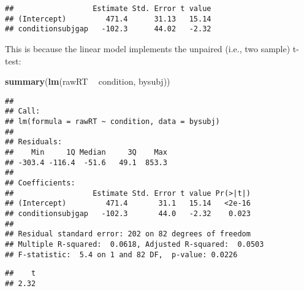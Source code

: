 \documentclass[12pt,]{krantz}
\newenvironment{Shaded}{\begin{snugshade}}{\end{snugshade}}
\newcommand{\DataTypeTok}[1]{\textcolor[rgb]{0.13,0.29,0.53}{#1}}
\newcommand{\DecValTok}[1]{\textcolor[rgb]{0.00,0.00,0.81}{#1}}
\newcommand{\KeywordTok}[1]{\textcolor[rgb]{0.13,0.29,0.53}{\textbf{#1}}}
\newcommand{\NormalTok}[1]{#1}
\newcommand{\OperatorTok}[1]{\textcolor[rgb]{0.81,0.36,0.00}{\textbf{#1}}}
\newcommand{\OtherTok}[1]{\textcolor[rgb]{0.56,0.35,0.01}{#1}}
\newcommand{\StringTok}[1]{\textcolor[rgb]{0.31,0.60,0.02}{#1}}
\begin{document}
\begin{Shaded}
\end{Shaded}

\begin{verbatim}
##                  Estimate Std. Error t value
## (Intercept)         471.4      31.13   15.14
## conditionsubjgap   -102.3      44.02   -2.32
\end{verbatim}

This is because the linear model implements the unpaired (i.e., two sample) t-test:

\begin{Shaded}
\begin{Highlighting}[]
\KeywordTok{summary}\NormalTok{(}\KeywordTok{lm}\NormalTok{(rawRT }\OperatorTok{~}\StringTok{ }\NormalTok{condition, bysubj))}
\end{Highlighting}
\end{Shaded}

\begin{verbatim}
## 
## Call:
## lm(formula = rawRT ~ condition, data = bysubj)
## 
## Residuals:
##    Min     1Q Median     3Q    Max 
## -303.4 -116.4  -51.6   49.1  853.3 
## 
## Coefficients:
##                  Estimate Std. Error t value Pr(>|t|)
## (Intercept)         471.4       31.1   15.14   <2e-16
## conditionsubjgap   -102.3       44.0   -2.32    0.023
## 
## Residual standard error: 202 on 82 degrees of freedom
## Multiple R-squared:  0.0618,	Adjusted R-squared:  0.0503 
## F-statistic:  5.4 on 1 and 82 DF,  p-value: 0.0226
\end{verbatim}

\begin{Shaded}
\end{Shaded}

\begin{verbatim}
##    t 
## 2.32
\end{verbatim}
\end{document}
